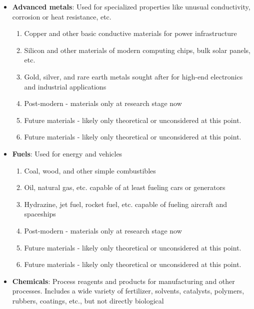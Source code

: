\documentclass{article}
\begin{document}
\begin{itemize}
\begin{itemize}
\begin{enumerate}
            \item Future materials - likely only theoretical or unconsidered at this point.
        \end{enumerate}
        \item \textbf{Advanced metals}: Used for specialized properties like unusual conductivity, corrosion or heat resistance, etc.
        \begin{enumerate}
            \item Copper and other basic conductive materials for power infrastructure
            \item Silicon and other materials of modern computing chips, bulk solar panels, etc.
            \item Gold, silver, and rare earth metals sought after for high-end electronics and industrial applications
            \item Post-modern - materials only at research stage now
            \item Future materials - likely only theoretical or unconsidered at this point.
            \item Future materials - likely only theoretical or unconsidered at this point.
        \end{enumerate}
        \item \textbf{Fuels}: Used for energy and vehicles
        \begin{enumerate}
            \item Coal, wood, and other simple combustibles
            \item Oil, natural gas, etc. capable of at least fueling cars or generators
            \item Hydrazine, jet fuel, rocket fuel, etc. capable of fueling aircraft and spaceships
            \item Post-modern - materials only at research stage now
            \item Future materials - likely only theoretical or unconsidered at this point.
            \item Future materials - likely only theoretical or unconsidered at this point.
        \end{enumerate}
        \item \textbf{Chemicals}: Process reagents and products for manufacturing and other processes. Includes a wide variety of
            fertilizer, solvents, catalysts, polymers, rubbers, coatings, etc., but not directly biological
        \begin{itemize}

\end{itemize}
\end{itemize}
\end{itemize}
\end{document}
